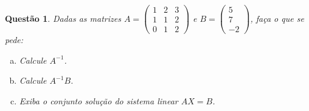 \documentclass[a4paper,10pt]{article}
\newtheorem{qst}{Questão}
\begin{document}
\begin{qst}
	Dadas as matrizes $A=\begin{pmatrix}
	1&2&3\\1&1&2\\0&1&2
	\end{pmatrix}$ e $B=\begin{pmatrix}
	5\\7\\-2
	\end{pmatrix}$, faça o que se pede:
	\begin{enumerate}[a)]
		\item Calcule $A^{-1}$.
		\item Calcule $A^{-1}B$.
		\item Exiba o conjunto solução do sistema linear $AX=B$.
	\end{enumerate}
\end{qst}
\end{document}

